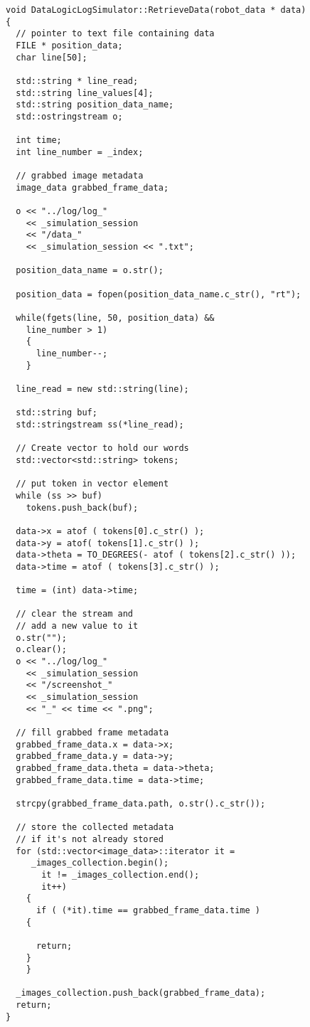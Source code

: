 \begin{lstlisting}[caption={\texttt{DataLogicLogSimulator::RetrieveData()} method},
    label={code:datalogiclogsimulator:retrievedata}, frame=trBL]
void DataLogicLogSimulator::RetrieveData(robot_data * data)
{
  // pointer to text file containing data
  FILE * position_data;
  char line[50];
  
  std::string * line_read;
  std::string line_values[4];
  std::string position_data_name;
  std::ostringstream o;
  
  int time;
  int line_number = _index;

  // grabbed image metadata
  image_data grabbed_frame_data;
  
  o << "../log/log_" 
    << _simulation_session 
    << "/data_" 
    << _simulation_session << ".txt";

  position_data_name = o.str();

  position_data = fopen(position_data_name.c_str(), "rt");

  while(fgets(line, 50, position_data) &&
	line_number > 1)
    {
      line_number--;
    }

  line_read = new std::string(line);

  std::string buf;
  std::stringstream ss(*line_read);

  // Create vector to hold our words
  std::vector<std::string> tokens;
  
  // put token in vector element
  while (ss >> buf)
    tokens.push_back(buf);

  data->x = atof ( tokens[0].c_str() );
  data->y = atof( tokens[1].c_str() );
  data->theta = TO_DEGREES(- atof ( tokens[2].c_str() ));
  data->time = atof ( tokens[3].c_str() );

  time = (int) data->time;

  // clear the stream and 
  // add a new value to it
  o.str("");
  o.clear();
  o << "../log/log_" 
    << _simulation_session 
    << "/screenshot_" 
    << _simulation_session 
    << "_" << time << ".png";

  // fill grabbed frame metadata
  grabbed_frame_data.x = data->x;
  grabbed_frame_data.y = data->y;
  grabbed_frame_data.theta = data->theta;
  grabbed_frame_data.time = data->time;

  strcpy(grabbed_frame_data.path, o.str().c_str());

  // store the collected metadata 
  // if it's not already stored
  for (std::vector<image_data>::iterator it =
	 _images_collection.begin();
       it != _images_collection.end();
       it++)
    {
      if ( (*it).time == grabbed_frame_data.time )
	{

	  return;
	}
    }

  _images_collection.push_back(grabbed_frame_data);
  return;
}
\end{lstlisting}

